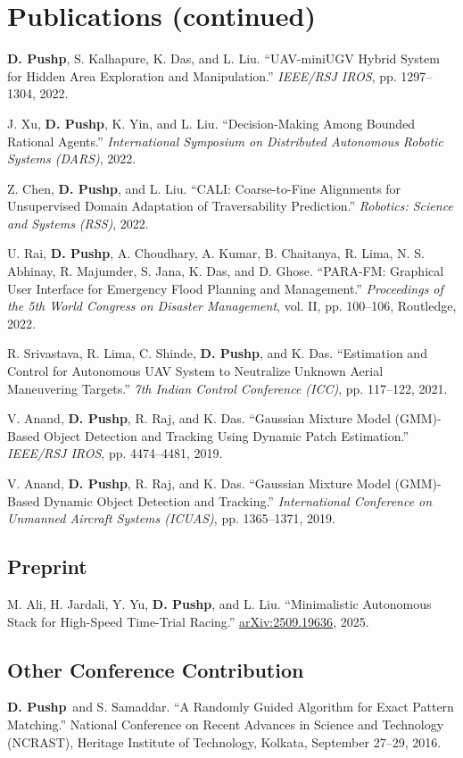 \documentclass[11pt,letterpaper]{article}
\newcommand{\me}{\textbf{D. Pushp}}
\begin{document}
\section{Publications (continued)}
\begin{enumerate}[label={[C\arabic*]},start=9]
\item \me, S. Kalhapure, K. Das, and L. Liu. ``UAV-miniUGV Hybrid System for Hidden Area Exploration and Manipulation.'' \emph{IEEE/RSJ IROS}, pp. 1297--1304, 2022.
\item J. Xu, \me, K. Yin, and L. Liu. ``Decision-Making Among Bounded Rational Agents.'' \emph{International Symposium on Distributed Autonomous Robotic Systems (DARS)}, 2022.
\item Z. Chen, \me, and L. Liu. ``CALI: Coarse-to-Fine Alignments for Unsupervised Domain Adaptation of Traversability Prediction.'' \emph{Robotics: Science and Systems (RSS)}, 2022.
\item U. Rai, \me, A. Choudhary, A. Kumar, B. Chaitanya, R. Lima, N. S. Abhinay, R. Majumder, S. Jana, K. Das, and D. Ghose. ``PARA-FM: Graphical User Interface for Emergency Flood Planning and Management.'' \emph{Proceedings of the 5th World Congress on Disaster Management}, vol. II, pp. 100--106, Routledge, 2022.
\item R. Srivastava, R. Lima, C. Shinde, \me, and K. Das. ``Estimation and Control for Autonomous UAV System to Neutralize Unknown Aerial Maneuvering Targets.'' \emph{7th Indian Control Conference (ICC)}, pp. 117--122, 2021.
\item V. Anand, \me, R. Raj, and K. Das. ``Gaussian Mixture Model (GMM)-Based Object Detection and Tracking Using Dynamic Patch Estimation.'' \emph{IEEE/RSJ IROS}, pp. 4474--4481, 2019.
\item V. Anand, \me, R. Raj, and K. Das. ``Gaussian Mixture Model (GMM)-Based Dynamic Object Detection and Tracking.'' \emph{International Conference on Unmanned Aircraft Systems (ICUAS)}, pp. 1365--1371, 2019.
\end{enumerate}
\subsection{Preprint}
M. Ali, H. Jardali, Y. Yu, \me, and L. Liu. ``Minimalistic Autonomous Stack for High-Speed Time-Trial Racing.'' \href{https://arxiv.org/abs/2509.19636}{arXiv:2509.19636}, 2025.
\subsection{Other Conference Contribution}
\me\ and S. Samaddar. ``A Randomly Guided Algorithm for Exact Pattern Matching.'' National Conference on Recent Advances in Science and Technology (NCRAST), Heritage Institute of Technology, Kolkata, September 27--29, 2016.
\end{document}
